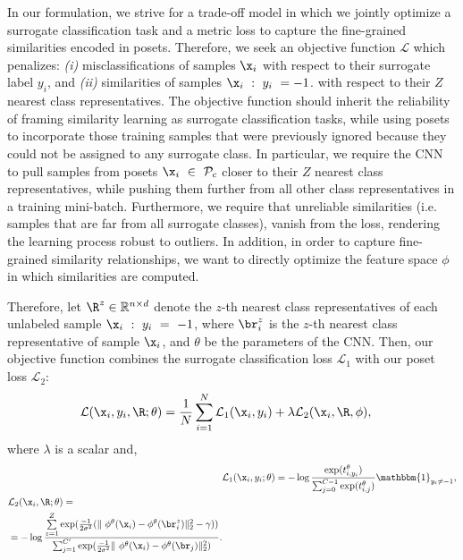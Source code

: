\documentclass[10pt,twocolumn,letterpaper]{article}
\begin{document}
In our formulation, we strive for a trade-off model in which we jointly optimize a surrogate classification task and a metric loss to capture the fine-grained similarities encoded in posets. Therefore, we seek an objective function $\mathcal{L}$ which penalizes: \emph{(i)} misclassifications of samples $\x_i$ with respect to their surrogate label $y_i$, and \emph{(ii)} similarities of samples $\x_i~:~y_i~=-1$. with respect to their $Z$ nearest class representatives. The objective function should inherit the reliability of framing similarity learning as surrogate classification tasks, while using posets to incorporate those training samples that were previously ignored because they could not be assigned to any surrogate class. In particular, we require the CNN to pull samples from posets $\x_i~\in~\mathcal{P}_c$ closer to their $Z$ nearest class representatives, while pushing them further from all other class representatives in a training mini-batch.  Furthermore, we require that unreliable similarities (i.e. samples that are far from all surrogate classes), vanish from the loss, rendering the learning process robust to outliers. In addition, in order to capture fine-grained similarity relationships, we want to directly optimize the feature space $\phi$ in which similarities are computed.

Therefore, let $\R^z \in \mathbb{R}^{n \times d}$ denote the $z$-th nearest class representatives of each unlabeled sample $\x_i~:~y_i~=~-1$, where $\br^z_i$ is the $z$-th nearest class representative of sample $\x_i$, and $\theta$ be the parameters of the CNN. Then, our objective function combines the surrogate classification loss $\mathcal{L}_1$ with our poset loss $\mathcal{L}_2$:
%
\begin{alignat}{2}
&\mathcal{L}(\x_i, y_i, \R; \theta) = \frac{1}{N} \sum_{i=1}^{N} \mathcal{L}_1(\x_i, y_i) + \lambda\mathcal{L}_2(\x_i, \R, \phi) \label{eq:loss},
\end{alignat}
%
where $\lambda$ is a scalar and,
%
\begin{alignat}{2}
&\mathcal{L}_1(\x_i,y_i; \theta)=-\log\frac{\exp(t^{\theta}_{i,y_i})}{\sum_{j=0}^{C-1}\exp(t^{\theta}_{i,j})} \mathbbm{1}_{y_i\neq-1}, \label{eq:loss1}\\
\begin{split}
&\mathcal{L}_2(\x_i,\R; \theta)=\\
&=-\log\frac{\sum\limits_{z=1}^{Z}\exp({\frac{-1}{2\sigma^2} ( \|\ \phi^\theta(\x_i) - \phi^\theta(\br^z_i) \|_2^2-\gamma}))} {\sum_{j=1}^{C'}\exp(\frac{-1}{2\sigma^2}\|\ \phi^\theta(\x_i) - \phi^\theta(\br_j) \|_2^2)}. \label{eq:loss2}
\end{split}
\end{alignat}
\end{document}
